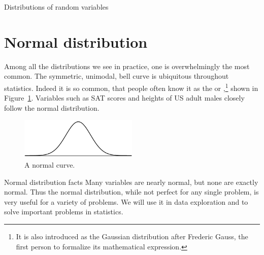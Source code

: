 \begin{chapterpage}{Distributions of random variables}
  \label{ch_distributions}
\end{chapterpage}
\renewcommand{\chapterfolder}{ch_distributions}



\section{Normal distribution}
\label{normalDist}


Among all the distributions we see in practice,
one is overwhelmingly the most common.
The symmetric, unimodal, bell curve is ubiquitous
throughout statistics.
Indeed it is so common, that people often know it as the
 or
,\footnote{It
  is also introduced as the Gaussian distribution after Frederic
  Gauss, the first person to formalize its mathematical
  expression.}
shown in Figure~\ref{simpleNormal}.
Variables such as SAT scores and heights of US adult males
closely follow the normal distribution.

\begin{figure}[h]
\centering
\includegraphics[width=0.5\textwidth]{ch_distributions/figures/simpleNormal/simpleNormal}
\caption{A normal curve.}
\label{simpleNormal}
\end{figure}

\begin{onebox}{Normal distribution facts}
  Many variables are nearly normal, but none are exactly normal.
  Thus the normal distribution, while not perfect for any single
  problem, is very useful for a variety of problems.
  We will use it in data exploration and to solve important
  problems in statistics.
\end{onebox}


